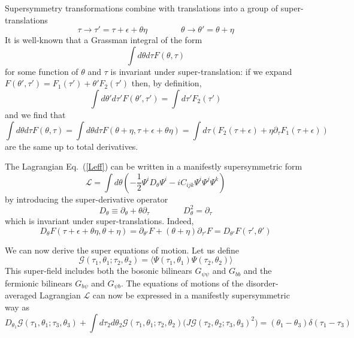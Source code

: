 \documentclass[aps,pre,preprint,onecolumn,citeautoscript,superscriptaddress,nofootinbib,eqsecnum]{revtex4-1}
\newcommand{\beq}{\begin{equation}}
\newcommand{\eeq}{\end{equation}}
\def\la{\label}
\begin{document}
Supersymmetry transformations combine with translations into a group of super-translations
\begin{equation} \la{SusyTr}
\tau \to \tau' = \tau + \epsilon + \theta \eta \qquad \qquad \theta \to \theta' = \theta + \eta
\end{equation}
It is well-known that a Grassman integral of the form 
\begin{equation}
\int d \theta d \tau F(\theta, \tau) 
\end{equation}
for some function of $\theta$ and $\tau$ is invariant under super-translation: if we expand $F(\theta', \tau') = F_1(\tau') + \theta' F_2(\tau')$ then, by 
definition, 
\begin{equation}
\int d \theta' d \tau' F(\theta', \tau') = \int d\tau' F_2(\tau') 
\end{equation}
and we find that 
\begin{equation}
\int d \theta d \tau F(\theta, \tau)  = \int d \theta d \tau F(\theta + \eta, \tau + \epsilon + \theta \eta) = \int d \tau \left(F_2(\tau + \epsilon)+ \eta \partial_\tau F_1(\tau + \epsilon)  \right)
\end{equation}
are the same up to total derivatives. 

The Lagrangian Eq.~(\ref{Leff}) can be written in a manifestly supersymmetric form
\beq
\mathcal{L}=\int d\theta(-\frac{1}{2}\Psi^iD_{\theta}\Psi^i- i C_{ijk}\Psi^i\Psi^j\Psi^k) \label{superL}
\eeq
by introducing the super-derivative operator 
\begin{equation}
D_\theta \equiv \partial_\theta + \theta \partial_\tau \qquad \qquad D_\theta^2 = \partial_\tau
\end{equation}
which is invariant under super-translations. Indeed, 
\begin{equation}
D_\theta F(\tau + \epsilon + \theta \eta,\theta + \eta) = \partial_{\theta'} F + (\theta + \eta) \partial_{\tau'} F = D_{\theta'} F(\tau', \theta')
\end{equation}

We can now derive the super equations of motion. Let us define
\beq
\mathcal{G}(\tau_1,\theta_1;\tau_2,\theta_2)=\langle \Psi(\tau_1,\theta_1)\Psi(\tau_2,\theta_2)\rangle
\eeq
This super-field includes both the bosonic bilinears $G_{\psi \psi}$ and $G_{bb}$ and the fermionic bilinears $G_{b \psi}$ and $G_{\psi b}$. 
The equations of motions of the disorder-averaged Lagrangian $\mathcal{L}$ can now be expressed in a manifestly supersymmetric way as
\beq 
D_{\theta_1} \mathcal{G}(\tau_1,\theta_1;\tau_3,\theta_3)+\int d\tau_2d\theta_2\mathcal{G}(\tau_1,\theta_1;\tau_2,\theta_2)\big(J \mathcal{G}(\tau_2,\theta_2;\tau_3,\theta_3)^2\big)=(\theta_1-\theta_3)\delta(\tau_1-\tau_3)\label{EOM}
\eeq
\end{document}
